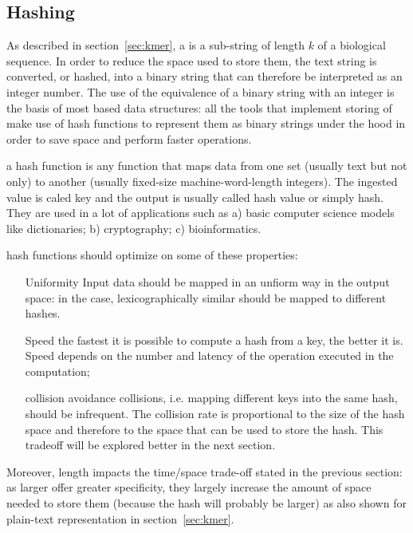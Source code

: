 \subsection{Hashing \kmers}
As described in section~\ref{sec:kmer}, a \kmer is a sub-string of length $k$ of a biological sequence. In order to reduce the space used to store them, the text string is converted, or hashed, into a binary string that can therefore be interpreted as an integer number. The use of the equivalence of a binary string with an integer is the basis of most \kmer based data structures: all the tools that implement storing of \kmers make use of hash functions to represent them as binary strings under the hood in order to save space and perform faster operations.
\begin{description}
	\item a hash function is any function that maps data from one set (usually text but not only) to another (usually fixed-size machine-word-length integers). The ingested value is caled key and the output is usually called hash value or simply hash. They are used in a lot of applications such as a) basic computer science models like dictionaries; b) cryptography; c) bioinformatics.
	\item hash functions should optimize on some of these properties:
	\begin{itemize}
		\item[Uniformity] Input data should be mapped in an unfiorm way in the output space: in the \kmer case, lexicographically similar \kemrs should be mapped to different hashes.
		\item[Speed] the fastest it is possible to compute a hash from a key, the better it is. Speed depends on the number and latency of the operation executed in the computation;
		\item[collision avoidance] collisions, i.e. mapping different keys into the same hash, should be infrequent. The collision rate is proportional to the size of the hash space and therefore to the space that can be used to store the hash. This tradeoff will be explored better in the next section.
	\end{itemize}
\end{description}
Moreover, \kmer length impacts the time/space trade-off stated in the previous section: as larger \kmer offer greater specificity, they largely increase the amount of space needed to store them (because the hash will probably be larger) as also shown for plain-text representation in section~\ref{sec:kmer}.

